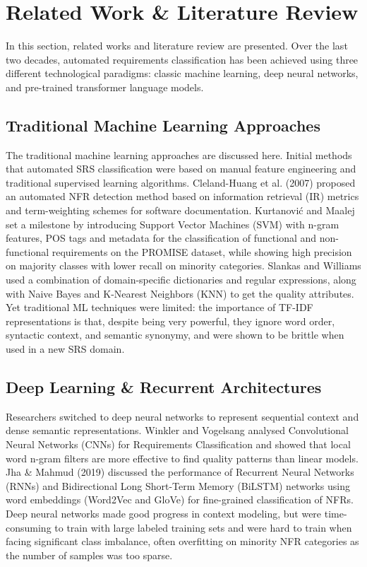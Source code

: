 \documentclass[11pt,a4paper]{article}
\begin{document}
\section{Related Work \& Literature Review}\label{sec:related}
In this section, related works and literature review are presented. Over the last two decades, automated requirements classification has been achieved using three different technological paradigms: classic machine learning, deep neural networks, and pre-trained transformer language models.

\subsection{Traditional Machine Learning Approaches}
The traditional machine learning approaches are discussed here. Initial methods that automated SRS classification were based on manual feature engineering and traditional supervised learning algorithms. Cleland-Huang et al. (2007) \cite{cleland2007automated} proposed an automated NFR detection method based on information retrieval (IR) metrics and term-weighting schemes for software documentation. Kurtanović and Maalej \cite{kurtanovic2017automatically} set a milestone by introducing Support Vector Machines (SVM) with n-gram features, POS tags and metadata for the classification of functional and non-functional requirements on the PROMISE dataset, while showing high precision on majority classes with lower recall on minority categories. Slankas and Williams \cite{slankas2013automated} used a combination of domain-specific dictionaries and regular expressions, along with Naive Bayes and K-Nearest Neighbors (KNN) to get the quality attributes. Yet traditional ML techniques were limited: the importance of TF-IDF representations is that, despite being very powerful, they ignore word order, syntactic context, and semantic synonymy, and were shown to be brittle when used in a new SRS domain.

\subsection{Deep Learning \& Recurrent Architectures}
Researchers switched to deep neural networks to represent sequential context and dense semantic representations. Winkler and Vogelsang \cite{winkler2018automatic} analysed Convolutional Neural Networks (CNNs) for Requirements Classification and showed that local word n-gram filters are more effective to find quality patterns than linear models. Jha \& Mahmud (2019) \cite{jha2019using} discussed the performance of Recurrent Neural Networks (RNNs) and Bidirectional Long Short-Term Memory (BiLSTM) networks using word embeddings (Word2Vec and GloVe) for fine-grained classification of NFRs. Deep neural networks made good progress in context modeling, but were time-consuming to train with large labeled training sets and were hard to train when facing significant class imbalance, often overfitting on minority NFR categories as the number of samples was too sparse.
\end{document}
